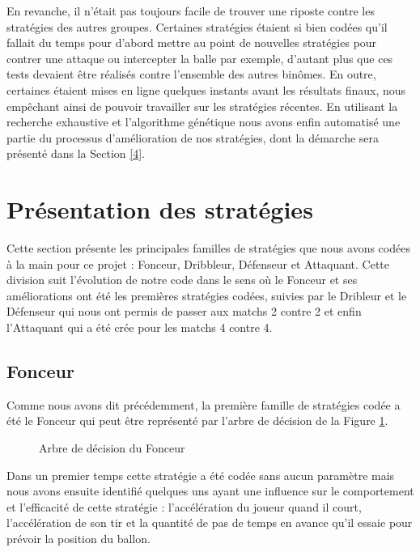 \documentclass[a4paper,12pt]{article}
\begin{document}
En revanche, il n’était pas toujours facile de trouver une riposte contre les stratégies des autres groupes. Certaines stratégies étaient si bien codées qu’il fallait du temps pour d’abord mettre au point de nouvelles stratégies pour contrer une attaque ou intercepter la balle par exemple, d’autant plus que ces tests devaient être réalisés contre l’ensemble des autres binômes. En outre, certaines étaient mises en ligne quelques instants avant les résultats finaux, nous empêchant ainsi de pouvoir travailler sur les stratégies récentes. En utilisant la recherche exhaustive et l'algorithme génétique nous avons enfin automatisé une partie du processus d’amélioration de nos stratégies, dont la démarche sera présenté dans la Section \ref{4}.

\section{Présentation des stratégies}
\label{3}

Cette section présente les principales \og familles \fg{} de stratégies que nous avons codées à la main pour ce projet : Fonceur, Dribbleur, Défenseur et Attaquant. Cette division suit l'évolution de notre code dans le sens où le Fonceur et ses améliorations ont été les premières stratégies codées, suivies par le Dribleur et le Défenseur qui nous ont permis de passer aux matchs 2 contre 2 et enfin l'Attaquant qui a été crée pour les matchs 4 contre 4.   

\subsection{Fonceur}

Comme nous avons dit précédemment, la première famille de stratégies codée a été le Fonceur qui peut être représenté par l'arbre de décision de la Figure \ref{Figure1}.

\begin{figure}[ht]
\centering

\caption{Arbre de décision du Fonceur}
\label{Figure1}
\end{figure}

Dans un premier temps cette stratégie a été codée sans aucun paramètre mais nous avons ensuite identifié quelques uns ayant une influence sur le comportement et l’efficacité de cette stratégie : l’accélération du joueur quand il court, l'accélération de son tir et la quantité de pas de temps en avance qu'il essaie pour prévoir la position du ballon.
\end{document}
